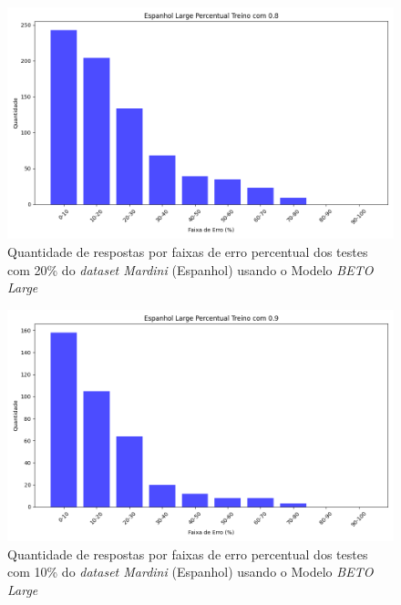 \begin{figure}[h!]
\includegraphics[width=\textwidth]{img/grafsEsp/Espanhol Large Percentual Treino com 0.8_quantidade.png}
\caption{Quantidade de respostas por faixas de erro percentual dos testes com 20\% do \textit{dataset Mardini} (Espanhol) usando o Modelo \textit{BETO Large}}\label{figure:10}
\end{figure}

\begin{figure}[h!]
\includegraphics[width=\textwidth]{img/grafsEsp/Espanhol Large Percentual Treino com 0.9_quantidade.png}
\caption{Quantidade de respostas por faixas de erro percentual dos testes com 10\% do \textit{dataset Mardini} (Espanhol) usando o Modelo \textit{BETO Large}}\label{figure:11}
\end{figure}